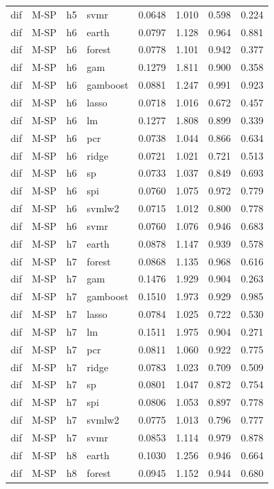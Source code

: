 \begin{ThreePartTable}
\begin{longtable}[t]{llclcccc}
dif & M-SP & h5 & svmr & 0.0648 & 1.010 & 0.598 & 0.224\\
\addlinespace
dif & M-SP & h6 & earth & 0.0797 & 1.128 & 0.964 & 0.881\\
dif & M-SP & h6 & forest & 0.0778 & 1.101 & 0.942 & 0.377\\
dif & M-SP & h6 & gam & 0.1279 & 1.811 & 0.900 & 0.358\\
dif & M-SP & h6 & gamboost & 0.0881 & 1.247 & 0.991 & 0.923\\
dif & M-SP & h6 & lasso & 0.0718 & 1.016 & 0.672 & 0.457\\
dif & M-SP & h6 & lm & 0.1277 & 1.808 & 0.899 & 0.339\\
dif & M-SP & h6 & pcr & 0.0738 & 1.044 & 0.866 & 0.634\\
dif & M-SP & h6 & ridge & 0.0721 & 1.021 & 0.721 & 0.513\\
dif & M-SP & h6 & sp & 0.0733 & 1.037 & 0.849 & 0.693\\
dif & M-SP & h6 & spi & 0.0760 & 1.075 & 0.972 & 0.779\\
dif & M-SP & h6 & svmlw2 & 0.0715 & 1.012 & 0.800 & 0.778\\
dif & M-SP & h6 & svmr & 0.0760 & 1.076 & 0.946 & 0.683\\
\addlinespace
dif & M-SP & h7 & earth & 0.0878 & 1.147 & 0.939 & 0.578\\
dif & M-SP & h7 & forest & 0.0868 & 1.135 & 0.968 & 0.616\\
dif & M-SP & h7 & gam & 0.1476 & 1.929 & 0.904 & 0.263\\
dif & M-SP & h7 & gamboost & 0.1510 & 1.973 & 0.929 & 0.985\\
dif & M-SP & h7 & lasso & 0.0784 & 1.025 & 0.722 & 0.530\\
dif & M-SP & h7 & lm & 0.1511 & 1.975 & 0.904 & 0.271\\
dif & M-SP & h7 & pcr & 0.0811 & 1.060 & 0.922 & 0.775\\
dif & M-SP & h7 & ridge & 0.0783 & 1.023 & 0.709 & 0.509\\
dif & M-SP & h7 & sp & 0.0801 & 1.047 & 0.872 & 0.754\\
dif & M-SP & h7 & spi & 0.0806 & 1.053 & 0.897 & 0.778\\
dif & M-SP & h7 & svmlw2 & 0.0775 & 1.013 & 0.796 & 0.777\\
dif & M-SP & h7 & svmr & 0.0853 & 1.114 & 0.979 & 0.878\\
\addlinespace
dif & M-SP & h8 & earth & 0.1030 & 1.256 & 0.946 & 0.664\\
dif & M-SP & h8 & forest & 0.0945 & 1.152 & 0.944 & 0.680\\

\end{longtable}
\end{ThreePartTable}

